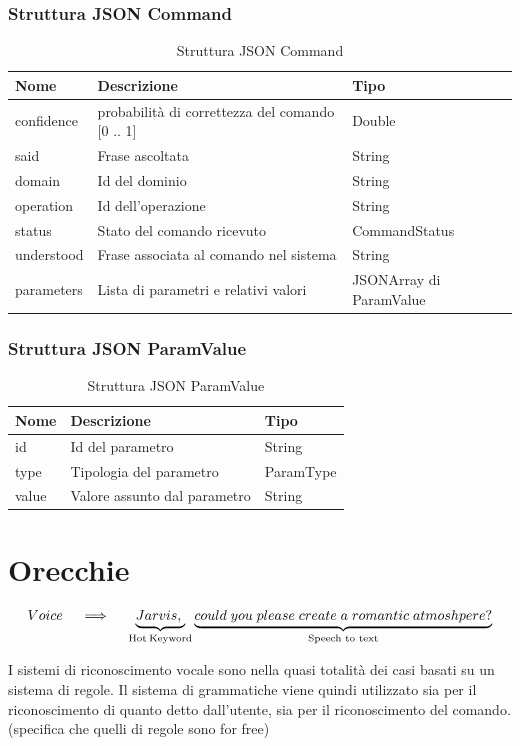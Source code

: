 \documentclass[twoside]{supsistudent}
\begin{document}
\subsection{Struttura JSON Command}
\begin{table}[H]
\centering
\caption{Struttura JSON Command}
\label{Struttura JSON Command}
\begin{tabular}{|l|l|l|}
\hline
Nome            & Descrizione                            & Tipo                        \\ \hline
confidence          & probabilità di correttezza del comando   [0 .. 1]                  & Double                      \\ \hline
said            & Frase ascoltata                        & String                      \\ \hline
domain          & Id del dominio                         & String                      \\ \hline
operation       & Id dell'operazione                     & String                      \\ \hline
status       & Stato del comando ricevuto                    & CommandStatus                      \\ \hline
understood      & Frase associata al comando nel sistema & String                      \\ \hline
parameters & Lista di parametri e relativi valori   & JSONArray di ParamValue \\ \hline
\end{tabular}
\end{table}
\subsection{Struttura JSON ParamValue}
\begin{table}[H]
\centering
\caption{Struttura JSON ParamValue}
\label{Struttura JSON ParamValue}
\begin{tabular}{|l|l|l|}
\hline
Nome  & Descrizione                  & Tipo      \\ \hline
id    & Id del parametro             & String    \\ \hline
type  & Tipologia del parametro      & ParamType \\ \hline
value & Valore assunto dal parametro & String    \\ \hline
\end{tabular}
\end{table}

\chapter{Orecchie}
\begin{center}
\[
 Voice \quad\implies\quad
\underbrace{Jarvis,\;}_\text{Hot\:Keyword}
\underbrace{could\;you\;please\;create\;a\;romantic\;atmoshpere?}_\text{Speech to text}
\]
\end{center}
I sistemi di riconoscimento vocale sono nella quasi totalità dei casi basati su un sistema di regole. Il sistema di grammatiche viene quindi utilizzato sia per il riconoscimento di quanto detto dall'utente, sia per il riconoscimento del comando. (specifica che quelli di regole sono for free)
\end{document}
